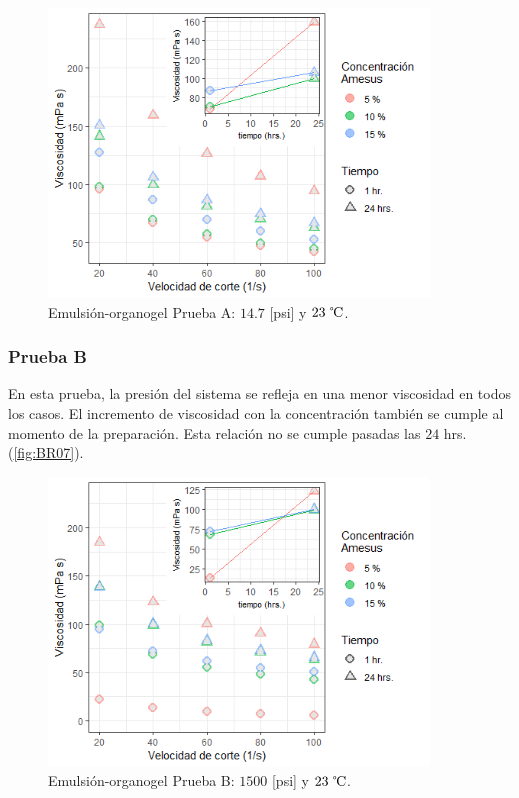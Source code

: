     \begin{figure}[h]
        \centering
        \includegraphics[width=0.9\textwidth]{R_plot/Rplot06.png}
        \caption[Prueba A emulsión organogel]{Emulsión-organogel Prueba A: $14.7$ [psi] y $23~\celsius$.}
        \label{fig:AR06}
    \end{figure}
    
    \subsubsection{Prueba B}
    En esta prueba, la presión del sistema se refleja en una menor viscosidad en todos los casos. El incremento de viscosidad con la concentración también se cumple al momento de la preparación. Esta relación no se cumple pasadas las $24$ hrs. (\autoref{fig:BR07}).
    
    \begin{figure}[h]
        \centering
        \includegraphics[width=0.9\textwidth]{R_plot/Rplot07.png}
        \caption[Prueba B emulsión organogel]{Emulsión-organogel Prueba B: $1500$ [psi] y $23~\celsius$.}
        \label{fig:BR07}
    \end{figure}

